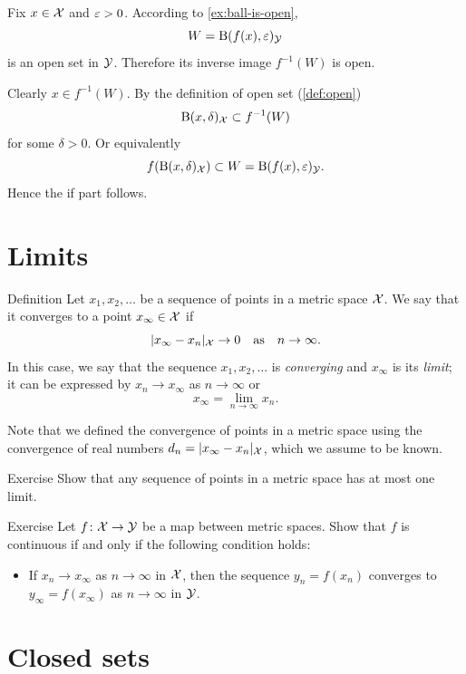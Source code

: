  Fix $x\in \mathcal{X}$ and $\varepsilon>0$.
According to \ref{ex:ball-is-open},
\[W=\mathrm{B}(f(x),\varepsilon)_{\mathcal{Y}}\] is an open set in $\mathcal{Y}$.
Therefore its inverse image $f^{-1}(W)$ is open.

Clearly $x\in f^{-1}(W)$.
By the definition of open set (\ref{def:open})
\[\mathrm{B}(x,\delta)_{\mathcal{X}}\subset f^{-1}(W)\] for some $\delta>0$.
Or equivalently
\[f(\mathrm{B}(x,\delta)_{\mathcal{X}})\subset W=\mathrm{B}(f(x),\varepsilon)_{\mathcal{Y}}.\]
Hence the if part follows.\qeds

\section{Limits}

\begin{thm}{Definition}\label{def:limit-metric}
Let $x_1,x_2,\ldots$ be a sequence of points in a metric space $\mathcal{X}$.
We say that it converges to a point $x_\infty\in \mathcal{X}$ if
\[|x_\infty-x_n|_{\mathcal{X}}\to 0\quad\text{as}\quad n\to \infty.\]
In this case, we say that the sequence $x_1,x_2,\ldots$ is \emph{converging} and $x_\infty$ is its \emph{limit};
it can be expressed by  $x_n\to x_\infty$ as $n\to\infty$ or
\[x_\infty=\lim_{n\to\infty}x_n.\]

\end{thm}

Note that we defined the convergence of points in a metric space using the convergence of real numbers $d_n=|x_\infty-x_n|_{\mathcal{X}}$, which we assume to be known.

\begin{thm}{Exercise}\label{ex:unique-lim-metr}
Show that any sequence of points in a metric space has at most one limit. 
\end{thm}


\begin{thm}{Exercise}\label{ex:continuous-limit}
Let $f\colon\mathcal{X}\to\mathcal{Y}$ be a map between metric spaces.
Show that $f$ is continuous if and only if the following condition holds:
\begin{itemize}
 \item If $x_n\to x_\infty$ as $n\to\infty$ in $\mathcal{X}$, then the sequence $y_n=f(x_n)$ converges to $y_\infty=f(x_\infty)$ as $n\to\infty$ in $\mathcal{Y}$.
\end{itemize}

\end{thm}

\section{Closed sets}

